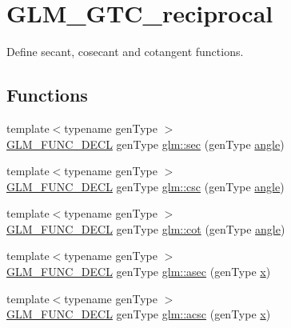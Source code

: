 \hypertarget{group__gtc__reciprocal}{}\section{G\+L\+M\+\_\+\+G\+T\+C\+\_\+reciprocal}
\label{group__gtc__reciprocal}


Define secant, cosecant and cotangent functions.  


\subsection*{Functions}
\begin{DoxyCompactItemize}
\item 
{\footnotesize template$<$typename gen\+Type $>$ }\\\mbox{\hyperlink{setup_8hpp_ab2d052de21a70539923e9bcbf6e83a51}{G\+L\+M\+\_\+\+F\+U\+N\+C\+\_\+\+D\+E\+CL}} gen\+Type \mbox{\hyperlink{group__gtc__reciprocal_gae4bcbebee670c5ea155f0777b3acbd84}{glm\+::sec}} (gen\+Type \mbox{\hyperlink{group__gtc__quaternion_gad4a4448baedb198b2b1e7880d2544dc9}{angle}})
\item 
{\footnotesize template$<$typename gen\+Type $>$ }\\\mbox{\hyperlink{setup_8hpp_ab2d052de21a70539923e9bcbf6e83a51}{G\+L\+M\+\_\+\+F\+U\+N\+C\+\_\+\+D\+E\+CL}} gen\+Type \mbox{\hyperlink{group__gtc__reciprocal_ga59dd0005b6474eea48af743b4f14ebbb}{glm\+::csc}} (gen\+Type \mbox{\hyperlink{group__gtc__quaternion_gad4a4448baedb198b2b1e7880d2544dc9}{angle}})
\item 
{\footnotesize template$<$typename gen\+Type $>$ }\\\mbox{\hyperlink{setup_8hpp_ab2d052de21a70539923e9bcbf6e83a51}{G\+L\+M\+\_\+\+F\+U\+N\+C\+\_\+\+D\+E\+CL}} gen\+Type \mbox{\hyperlink{group__gtc__reciprocal_ga3a7b517a95bbd3ad74da3aea87a66314}{glm\+::cot}} (gen\+Type \mbox{\hyperlink{group__gtc__quaternion_gad4a4448baedb198b2b1e7880d2544dc9}{angle}})
\item 
{\footnotesize template$<$typename gen\+Type $>$ }\\\mbox{\hyperlink{setup_8hpp_ab2d052de21a70539923e9bcbf6e83a51}{G\+L\+M\+\_\+\+F\+U\+N\+C\+\_\+\+D\+E\+CL}} gen\+Type \mbox{\hyperlink{group__gtc__reciprocal_ga2c5b7f962c2c9ff684e6d2de48db1f10}{glm\+::asec}} (gen\+Type \mbox{\hyperlink{glad_8h_a92d0386e5c19fb81ea88c9f99644ab1d}{x}})
\item 
{\footnotesize template$<$typename gen\+Type $>$ }\\\mbox{\hyperlink{setup_8hpp_ab2d052de21a70539923e9bcbf6e83a51}{G\+L\+M\+\_\+\+F\+U\+N\+C\+\_\+\+D\+E\+CL}} gen\+Type \mbox{\hyperlink{group__gtc__reciprocal_ga1b4bed91476b9b915e76b4a30236d330}{glm\+::acsc}} (gen\+Type \mbox{\hyperlink{glad_8h_a92d0386e5c19fb81ea88c9f99644ab1d}{x}})

\end{DoxyCompactItemize}
